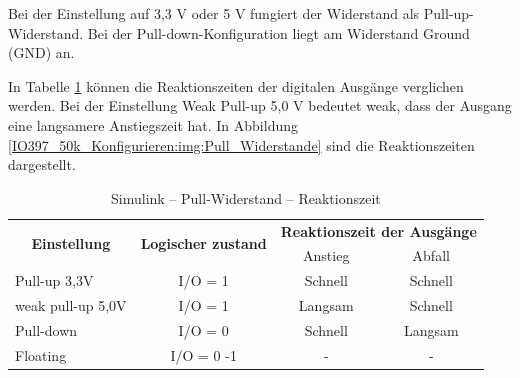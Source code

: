 Bei der Einstellung auf 3,3 V oder 5 V fungiert der Widerstand als Pull-up-Widerstand. Bei der Pull-down-Konfiguration liegt am Widerstand Ground (GND) an.



In Tabelle \ref{IO397_50k_Konfigurieren:tab:Reaktionszeit} können die Reaktionszeiten der digitalen Ausgänge verglichen werden. Bei der Einstellung Weak Pull-up 5,0 V bedeutet \frqq weak\flqq, dass der Ausgang eine langsamere Anstiegszeit hat. In Abbildung \ref{IO397_50k_Konfigurieren:img:Pull_Widerstande} sind die Reaktionszeiten dargestellt.


\pagebreak[1]
\begin{table}[!ht]
	\centering
	\caption{Simulink – Pull-Widerstand – Reaktionszeit}
	\label{IO397_50k_Konfigurieren:tab:Reaktionszeit}
	\begin{tabular}{lccc}
		\hline
		\multicolumn{1}{c}{\multirow{2}{*}{\textbf{Einstellung}}} & \multicolumn{1}{c}{\multirow{2}{*}{\textbf{Logischer zustand}}} & \multicolumn{2}{c}{\textbf{Reaktionszeit der Ausgänge}}           \\ \cline{3-4}
		\multicolumn{1}{c}{}                                      & \multicolumn{1}{c}{}                                            & Anstieg                                                 & Abfall  \\ \hline
		\multicolumn{1}{l|}{Pull-up 3,3V}                         & I/O = 1                                                         & Schnell                                                 & Schnell \\
		\multicolumn{1}{l|}{weak pull-up 5,0V}                    & I/O = 1                                                         & Langsam                                                 & Schnell \\
		\multicolumn{1}{l|}{Pull-down}                            & I/O = 0                                                         & Schnell                                                 & Langsam \\
		\multicolumn{1}{l|}{Floating}                             & I/O = 0 -1                                                      & -                                                       & -       \\ \hline
	\end{tabular}
\end{table}
\pagebreak[1]



